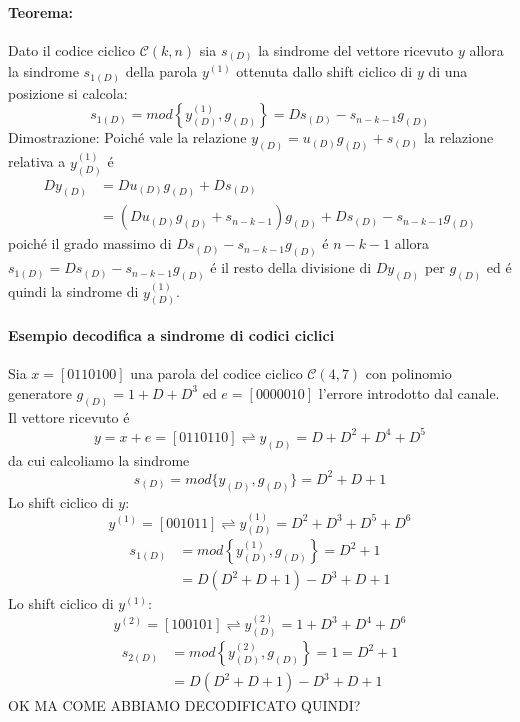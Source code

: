            \paragraph{Teorema:} Dato il codice ciclico $\mathcal{C}(k,n)$ sia $s_{(D)}$ la sindrome del vettore ricevuto
                $y$ allora la sindrome $s_{1(D)}$ della parola $y^{(1)}$ ottenuta dallo shift ciclico di $y$ di una posizione 
                si calcola:
                \[
                    s_{1(D)} = mod\left\{y^{(1)}_{(D)},g_{(D)}\right\} = Ds_{(D)}-s_{n-k-1}g_{(D)}    
                \]
                Dimostrazione: Poiché vale la relazione $y_{(D)} = u_{(D)}g_{(D)} + s_{(D)}$ la relazione relativa a $y^{(1)}_{(D)}$ é \
                \begin{align}
                    Dy_{(D)} &= Du_{(D)}g_{(D)} + Ds_{(D)}\nonumber \\
                            &= (Du_{(D)}g_{(D)} +s_{n-k-1})g_{(D)} + Ds_{(D)}-s_{n-k-1}g_{(D)}\nonumber
                \end{align}
                poiché il grado massimo di $Ds_{(D)}-s_{n-k-1}g_{(D)}$ é $n-k-1$ allora $s_{1(D)} = Ds_{(D)}-s_{n-k-1}g_{(D)}$ é il 
                resto della divisione di $Dy_{(D)}$ per $g_{(D)}$ ed é quindi la sindrome di $y^{(1)}_{(D)}$.
            \paragraph{Esempio decodifica a sindrome di codici ciclici}
                Sia $x=[0110100]$ una parola del codice ciclico $\mathcal{C}(4,7)$ con polinomio generatore $g_{(D)} = 1 + D + D^3$
                ed $e=[0000010]$ l'errore introdotto dal canale. Il vettore ricevuto é 
                \[
                    y= x+e = [0110110]\rightleftharpoons y_{(D)} = D+D^2+D^4+D^5 
                \]
                da cui calcoliamo la sindrome 
                \[
                    s_{(D)} = mod\{y_{(D)},g_{(D)}\}=D^2+D+1
                \]
                Lo shift ciclico di $y$:
                \[
                    y^{(1)} = [001011] \rightleftharpoons y^{(1)}_{(D)} = D^2+D^3+D^5+D^6   
                \]
                \begin{align}
                    s_{1(D)} &= mod\left\{y^{(1)}_{(D)},g_{(D)}\right\}= D^2+1  \nonumber \\
                             &= D(D^2+D+1)-D^3+D+1 \nonumber
                \end{align}
                Lo shift ciclico di $y^{(1)}$:
                \[
                    y^{(2)} = [100101] \rightleftharpoons y^{(2)}_{(D)} = 1+D^3+D^4+D^6   
                \]
                \begin{align}
                    s_{2(D)} &= mod\left\{y^{(2)}_{(D)},g_{(D)}\right\}= 1 = D^2+1  \nonumber \\
                             &= D(D^2+D+1)-D^3+D+1 \nonumber
                \end{align}
                OK MA COME ABBIAMO DECODIFICATO QUINDI?
